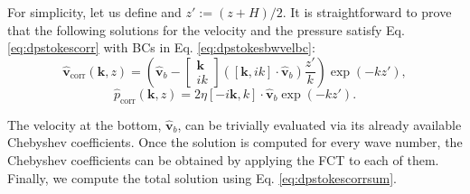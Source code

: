 \documentclass[twoside,openright,titlepage,numbers=noenddot,%
headinclude,footinclude,cleardoublepage=empty,abstract=on,
BCOR=5mm,fontsize=11pt, dvipsnames, paper=b5
]{scrreprt}
\renewcommand{\vec}[1]{\bm{#1}}
\newcommand{\fou}[1]{\widehat{#1}}
\newcommand{\fvel}{v}
\newcommand{\corr}{\text{corr}}
\begin{document}
For simplicity, let us define and $z':=(z+H)/2$.
It is straightforward to prove that the following solutions for the velocity and the pressure satisfy Eq. \eqref{eq:dpstokescorr} with \glspl{BC} in Eq. \eqref{eq:dpstokesbwvelbc}:
\begin{equation}
  \fou{\vec{\fvel}}_{\corr}(\vec{k}, z) = \left(  \fou{\vec{\fvel}}_b -
    \begin{bmatrix}
    \vec{k}\\
    ik
  \end{bmatrix}
  \left(\left[\vec{k},ik\right]\cdot\fou{\vec{\fvel}}_b\right) \frac{z'}{k}\right)\exp\left(-kz'\right),
\end{equation}
\begin{equation}
  \fou{p}_{\corr}(\vec{k}, z) = 2\eta \left[-i\vec{k},k\right]\cdot\fou{\vec{\fvel}}_b\exp\left(-kz'\right).
\end{equation}

The velocity at the bottom, $\fou{\vec{\fvel}}_b$, can be trivially evaluated via its already available Chebyshev coefficients. Once the solution is computed for every wave number, the Chebyshev coefficients can be obtained by applying the \gls{FCT} to each of them. Finally, we compute the total solution using Eq. \eqref{eq:dpstokescorrsum}.
\end{document}

